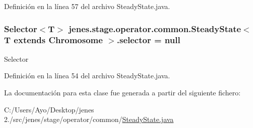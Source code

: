 Definición en la línea 57 del archivo Steady\-State.\-java.

\hypertarget{classjenes_1_1stage_1_1operator_1_1common_1_1_steady_state_3_01_t_01extends_01_chromosome_01_4_a83a734a69acdc4ee13d42982a43e8ba1}{
\subsubsection[{selector}]{\setlength{\rightskip}{0pt plus 5cm}Selector$<$T$>$ jenes.\-stage.\-operator.\-common.\-Steady\-State$<$ T extends Chromosome $>$.selector = null\hspace{0.3cm}{\ttfamily [protected]}}}\label{classjenes_1_1stage_1_1operator_1_1common_1_1_steady_state_3_01_t_01extends_01_chromosome_01_4_a83a734a69acdc4ee13d42982a43e8ba1}
Selector 

Definición en la línea 54 del archivo Steady\-State.\-java.



La documentación para esta clase fue generada a partir del siguiente fichero\-:\begin{DoxyCompactItemize}
\item 
C\-:/\-Users/\-Ayo/\-Desktop/jenes 2./src/jenes/stage/operator/common/\hyperlink{_steady_state_8java}{Steady\-State.\-java}\end{DoxyCompactItemize}
